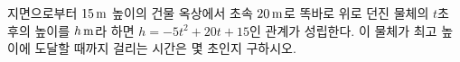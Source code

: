 \hspace*{2mm}\begin{minipage}[t]{\dimexpr\linewidth-2mm\relax}\vspace{0pt}
지면으로부터 $15\mkern3mu \mathrm{m}$ 높이의 건물 옥상에서 초속 $20\mkern3mu \mathrm{m}$로 똑바로 위로 던진 물체의 $t$초 후의 높이를 $h\mkern3mu \mathrm{m}$라 하면 $h=-5t^2+20t+15$인 관계가 성립한다. 이 물체가 최고 높이에 도달할 때까지 걸리는 시간은 몇 초인지 구하시오.\end{minipage}
